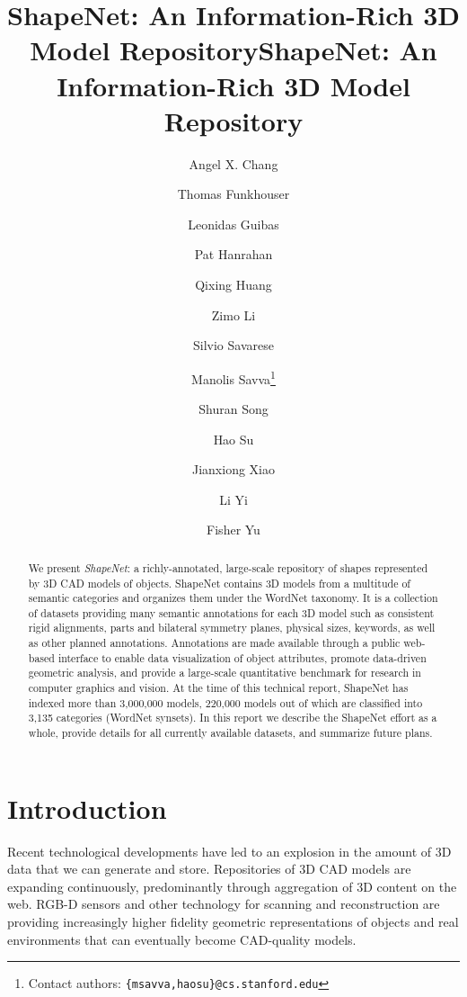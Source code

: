 \title{ShapeNet: An Information-Rich 3D Model Repository}



\title{ShapeNet: An Information-Rich 3D Model Repository}

\author[1]{Angel X. Chang}
\author[2]{Thomas Funkhouser}
\author[1]{Leonidas Guibas}
\author[1]{Pat Hanrahan}
\author[3]{Qixing Huang}
\author[3]{Zimo Li}
\author[1]{Silvio Savarese}
\author[1]{Manolis Savva\thanks{Contact authors: \texttt{\{msavva,haosu\}@cs.stanford.edu}}}
\author[2]{Shuran Song}
\author[1]{Hao Su\protect\contactAuthorMark}
\author[2]{Jianxiong Xiao}
\author[1]{Li Yi}
\author[2]{Fisher Yu}

\maketitle

\begin{abstract}
We present \emph{ShapeNet}: a richly-annotated, large-scale repository of shapes represented by 3D CAD models of objects.  ShapeNet contains 3D models from a multitude of semantic categories and organizes them under the WordNet taxonomy.  It is a collection of datasets providing many semantic annotations for each 3D model such as consistent rigid alignments, parts and bilateral symmetry planes, physical sizes, keywords, as well as other planned annotations.  Annotations are made available through a public web-based interface to enable data visualization of object attributes, promote data-driven geometric analysis, and provide a large-scale quantitative benchmark for research in computer graphics and vision. At the time of this technical report, ShapeNet has indexed more than 3,000,000 models, 220,000 models out of which are classified into 3,135 categories (WordNet synsets). In this report we describe the ShapeNet effort as a whole, provide details for all currently available datasets, and summarize future plans.
\end{abstract}

\section{Introduction}
Recent technological developments have led to an explosion in the amount of 3D data that we can generate and store.  Repositories of 3D CAD models are expanding continuously, predominantly through aggregation of 3D content on the web.  RGB-D sensors and other technology for scanning and reconstruction are providing increasingly higher fidelity geometric representations of objects and real environments that can eventually become CAD-quality models.

